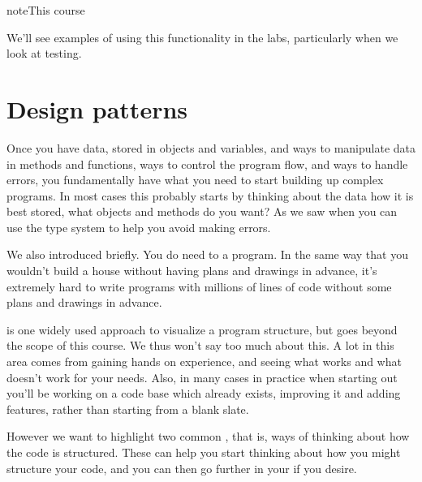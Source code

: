 \documentclass[letterpaper,10pt,british]{sphinxmanual}
\begin{document}
\begin{sphinxadmonition}{note}{This course}

\sphinxAtStartPar
We’ll see examples of using this functionality in the labs, particularly when we look at testing.
\end{sphinxadmonition}

\sphinxstepscope


\section{Design patterns}
\label{\detokenize{chapters/programming_fundamentals/design_patterns:design-patterns}}\label{\detokenize{chapters/programming_fundamentals/design_patterns::doc}}
\sphinxAtStartPar
Once you have data, stored in objects and variables, and ways to manipulate data in methods and functions, ways to control the program flow, and ways to handle errors, you fundamentally have what you need to start building up complex programs. In most cases this probably starts by thinking about the data \sphinxhyphen{} how it is best stored, what objects and methods do you want? As we saw when {\hyperref[\detokenize{chapters/programming_fundamentals/objects:objects}]{}} you can use the type system to help you avoid making errors.

\sphinxAtStartPar
We also introduced {\hyperref[\detokenize{chapters/software_lifecycle/software_architecture:software-architecture}]{}} briefly. You do need to  a program. In the same way that you wouldn’t build a house without having plans and drawings in advance, it’s extremely hard to write programs with millions of lines of code without some plans and drawings in advance.

\sphinxAtStartPar
{} is one widely used approach to visualize a program structure, but goes beyond the scope of this course. We thus won’t say too much about this. A lot in this area comes from gaining hands on experience, and seeing what works and what doesn’t work for your needs. Also, in many cases in practice when starting out you’ll be working on a code base which already exists, improving it and adding features, rather than starting from a blank slate.

\sphinxAtStartPar
However we want to highlight two common , that is, ways of thinking about how the code is structured. These can help you start thinking about how you might structure your code, and you can then go further in your  if you desire.
\end{document}
